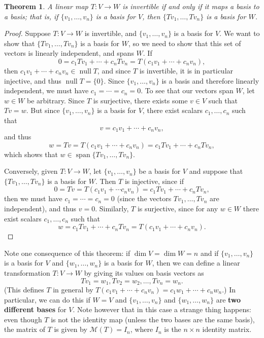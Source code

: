 \documentclass[12pt,letterpaper]{article}
\newtheorem{theorem}{Theorem}
\newcommand{\M}{\mathcal{M}}
\DeclareMathOperator{\spn}{span}
\DeclareMathOperator{\nul}{null}
\begin{document}
\begin{theorem}
A linear map $T:V\to W$ is invertible if and only if it maps a basis to a basis; that is, if $\{v_1,\ldots, v_n\}$ is a basis for $V$, then $\{Tv_1,\ldots, Tv_n\}$ is a basis for $W$.
\end{theorem}
\begin{proof}
Suppose $T:V\to W$ is invertible, and $\{v_1,\ldots, v_n\}$ is a basis for $V$. We want to show that $\{Tv_1,\ldots, Tv_n\}$ is a basis for $W$, so we need to show that this set of vectors is linearly independent, and spans $W$. If
\[
0 = c_1Tv_1+\cdots +c_nTv_n = T(c_1v_1+\cdots + c_nv_n),
\]
then $c_1v_1+\cdots +c_nv_n\in\nul T$, and since $T$ is invertible, it is in particular injective, and thus $\nul T = \{0\}$. Since $\{v_1,\ldots, v_n\}$ is a basis and therefore linearly independent, we must have $c_1=\cdots=c_n=0$. To see that our vectors span $W$, let $w\in W$ be arbitrary. Since $T$ is surjective, there exists some $v\in V$ such that $Tv=w$. But since $\{v_1,\ldots, v_n\}$ is a basis for $V$, there exist scalars $c_1,\ldots, c_n$ such that 
\[
v = c_1v_1+\cdots +c_nv_n,
\]
and thus
\[
w = Tv = T(c_1v_1+\cdots +c_nv_n) = c_1Tv_1+\cdots + c_nTv_n,
\]
which shows that $w\in\spn\{Tv_1,\ldots, Tv_n\}$.

Conversely, given $T:V\to W$, let $\{v_1,\ldots, v_n\}$ be a basis for $V$ and suppose that $\{Tv_1,\ldots, Tv_n\}$ is a basis for $W$. Then $T$ is injective, since if
\[
0 = Tv = T(c_1v_1+\cdots c_nv_n)=c_1Tv_1+\cdots + c_nTv_n,
\]
then we must have $c_1=\cdots=c_n=0$ (since the vectors $Tv_1,\ldots, Tv_n$ are independent), and thus $v=0$. Similarly, $T$ is surjective, since for any $w\in W$ there exist scalars $c_1,\ldots, c_n$ such that 
\[
w= c_1Tv_1+\cdots + c_nTv_n = T(c_1v_1+\cdots + c_nv_n).
\]
\end{proof}
Note one consequence of this theorem: if $\dim V=\dim W=n$ and if $\{v_1,\ldots, v_n\}$ is a basis for $V$ and $\{w_1,\ldots, w_n\}$ is a basis for $W$, then we can define a linear transformation $T:V\to W$ by giving its values on basis vectors as
\[
Tv_1=w_1, Tv_2 = w_2,\ldots, Tv_n=w_n.
\]
(This defines $T$ in general by $T(c_1v_1+\cdots + c_nv_n) = c_1w_1+\cdots + c_nw_n$.) 
In particular, we can do this if $W=V$ and $\{v_1,\ldots, v_n\}$ and $\{w_1,\ldots, w_n\}$ are {\bf two different bases} for $V$. Note however that in this case a strange thing happens: even though $T$ is not the identity map (unless the two bases are the same basis), the matrix of $T$ is given by $\M(T) = I_n$, where $I_n$ is the $n\times n$ identity matrix.
\end{document}
